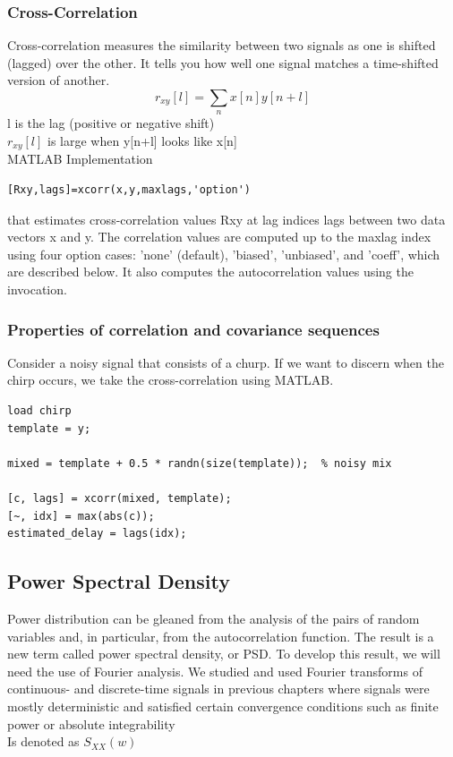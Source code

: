 \documentclass{article}
\begin{document}
\subsubsection{Cross-Correlation}
Cross-correlation measures the similarity between two signals as one is shifted (lagged) over the other. It tells you how well one signal matches a time-shifted version of another.
\begin{equation}
r_{xy}[l]=\sum_{n}x[n]y[n+l]
\end{equation}
l is the lag (positive or negative shift) \\
$r_{xy}[l]$ is large when y[n+l] looks like x[n] \\
\vspace{1em}
MATLAB Implementation 
\begin{lstlisting}
[Rxy,lags]=xcorr(x,y,maxlags,'option')
\end{lstlisting}
that estimates cross-correlation values Rxy at lag indices lags between
two data vectors x and y. The correlation values are computed up to
the maxlag index using four option cases: 'none' (default), 'biased',
'unbiased', and 'coeff', which are described below. It also computes
the autocorrelation values using the invocation. \\
\vspace{1em}
\subsubsection{Properties of correlation and covariance sequences}


Consider a noisy signal that consists of a churp. If we want to discern when the chirp occurs, we take the cross-correlation using MATLAB.
\begin{lstlisting}
load chirp
template = y;

mixed = template + 0.5 * randn(size(template));  % noisy mix

[c, lags] = xcorr(mixed, template);
[~, idx] = max(abs(c));
estimated_delay = lags(idx);    
\end{lstlisting}
\subsection{Power Spectral Density}
Power distribution can be gleaned from the analysis of
the pairs of random variables and, in particular, from the autocorrelation
function. The result is a new term called power spectral density, or PSD.
To develop this result, we will need the use of Fourier analysis. We
studied and used Fourier transforms of continuous- and discrete-time
signals in previous chapters where signals were mostly deterministic and
satisfied certain convergence conditions such as finite power or absolute
integrability \\
\vspace{1em}
Is denoted as $S_{XX}(w)$
\end{document}
